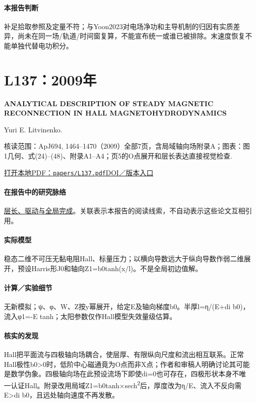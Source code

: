 \documentclass[UTF8,a4paper,11pt,openany,fontset=fandol]{ctexbook}
\begin{document}
\paragraph{本报告判断}补足拾取参照及定量不符；与Yoon2023对电场净功和主导机制的归因有实质差异，尚未在同一场/轨道/时间窗复算，不能宣布统一或谁已被排除。末速度恢复不能单独代替电功积分。

\section{L137：2009年}\label{paper:L137}

\textbf{ANALYTICAL DESCRIPTION OF STEADY MAGNETIC RECONNECTION IN HALL MAGNETOHYDRODYNAMICS}\citep{L137}\

Yuri E. Litvinenko.

\textsf{核读范围：}ApJ694, 1464–1470（2009）全部7页，含局域轴向场附录A；\textsf{图表：}图1几何、式(24)–(48)、附录A1–A4；页5的O点展开和层长表达直接视觉检查.

\href{run:../papers/L137.pdf}{打开本地PDF：\texttt{papers/L137.pdf}}\quad\href{https://doi.org/10.1088/0004-637x/694/2/1464}{DOI／版本入口}

\paragraph{在报告中的研究脉络}\hyperref[story:global]{层长、驱动与全局完成}。关联表示本报告的阅读线索，不自动表示这些论文互相引用。

\paragraph{实际模型}稳态二维不可压无黏电阻Hall、标量压力；以横向导数远大于纵向导数作弱二维展开，预设Harris形J0和轴向Z1=b0tanh(x/l)。不是全局初边值解。

\paragraph{计算／实验细节}无新模拟；ψ、φ、W、Z按y幂展开，给定E及轴向梯度b0。半厚l=η/(E+di b0)，流入φ1=-E tanh；太阳参数仅作Hall模型失效量级估算。

\paragraph{核实的发现}Hall把平面流与四极轴向场耦合，使层厚、有限纵向尺度和流出相互联系。正常Hall极性b0>0时，低阶中心磁通竟为O点而非X点；作者和审稿人明确讨论其可能是数学伪象。四极轴向场在此预设流场下即使di=0也可存在，四极形状本身不唯一认证Hall。附录改用局域Z1=b0tanh×sech\textsuperscript{2}后，厚度改为η/E、流入不反向需E>di b0，且远处轴向速度不再发散。
\end{document}
